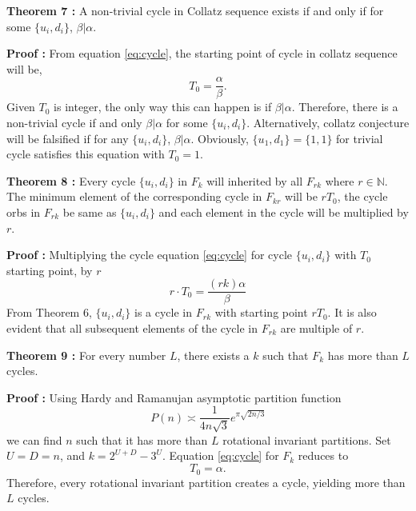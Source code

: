 \documentclass[12pt]{article} %
\begin{document}
\textbf{Theorem 7 :}
A non-trivial cycle in Collatz sequence exists if and only if for some $\{u_i, d_i\}$, $\beta \vert \alpha$. 

\textbf{Proof :}
From equation \eqref{eq:cycle}, the starting point of cycle in collatz sequence will be, 
\[ 
T_0 = \frac{\alpha}{\beta}.
\]
Given $T_0$ is integer, the only way this can happen is if $\beta  \vert \alpha$. Therefore, there is a non-trivial cycle if and only $\beta \vert \alpha$ for some $\{u_i, d_i\}$. Alternatively, collatz conjecture will be falsified if for any $\{u_i, d_i\}$, $\beta \vert \alpha$. Obviously, $\{u_1, d_1\} = \{1,1\}$ for trivial cycle satisfies this equation with $T_0 = 1$.
\newline

\textbf{Theorem 8 :}
Every cycle $\{u_i, d_i\}$ in $F_k$ will inherited by all $F_{rk}$ where $r \in \mathbb{N}$. The minimum element of the corresponding cycle in $F_{kr}$ will be $rT_0$, the cycle orbs in $F_{rk}$ be same as $\{u_i, d_i\}$ and each element in the cycle will be multiplied by $r$.

\textbf{Proof :}
Multiplying the cycle equation \eqref{eq:cycle} for cycle $\{u_i, d_i\}$ with $T_0$ starting point, by $r$
\[
r \cdot T_0 = \frac{(r k) \alpha}{\beta}
\]
From Theorem 6, $\{u_i, d_i\}$ is a cycle in $F_{rk}$ with starting point $r T_0$. It is also evident that all subsequent elements of the cycle in $F_{rk}$ are multiple of $r$.\\
\newline

\textbf{Theorem 9 :}
 For every number $L$, there exists a $k$ such that $F_k$ has more than $L$ cycles.
 
 \textbf{Proof :}
 Using Hardy and Ramanujan asymptotic partition function
 \[
 P(n) \asymp \frac{1}{4 n \sqrt{3}} e^{\pi \sqrt{2n/3}}
 \]
 we can find $n$ such that it has more than $L$ rotational invariant partitions. Set $U = D = n$,  and $k = 2^{U+D} - 3^U$. Equation \ref{eq:cycle} for $F_k$ reduces to 
\[T_0 = \alpha.\]
Therefore, every rotational invariant partition creates a cycle, yielding more than $L$ cycles.
\newline
\end{document}
